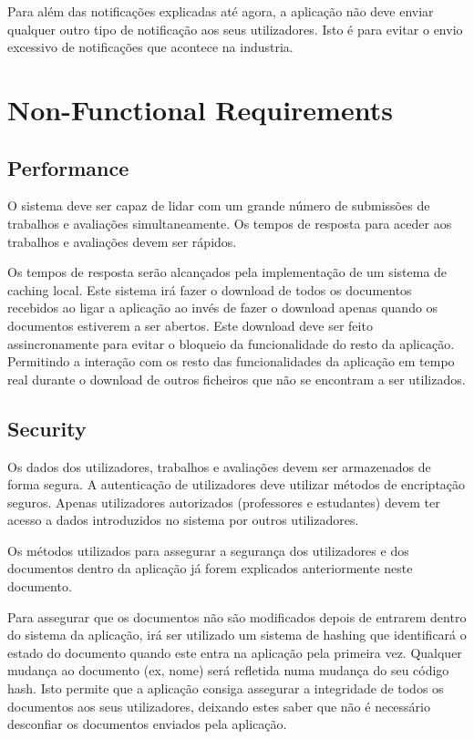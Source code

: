 \documentclass[10pt]{article}
\begin{document}
Para além das notificações explicadas até agora, a aplicação não deve enviar qualquer outro tipo de notificação
aos seus utilizadores. Isto é para evitar o envio excessivo de notificações que acontece na industria.

\newpage

\section{Non-Functional Requirements}

\subsection{Performance}
O sistema deve ser capaz de lidar com um grande número de submissões de trabalhos e avaliações simultaneamente. 
Os tempos de resposta para aceder aos trabalhos e avaliações devem ser rápidos.

Os tempos de resposta serão alcançados pela implementação de um sistema de caching local.
Este sistema irá fazer o download de todos os documentos recebidos ao ligar a aplicação ao invés
de fazer o download apenas quando os documentos estiverem a ser abertos. Este download deve ser
feito assincronamente para evitar o bloqueio da funcionalidade do resto da aplicação. Permitindo
a interação com os resto das funcionalidades da aplicação em tempo real durante o download de outros
ficheiros que não  se encontram a ser utilizados.

\subsection{Security}
Os dados dos utilizadores, trabalhos e avaliações devem ser armazenados de forma segura. 
A autenticação de utilizadores deve utilizar métodos de encriptação seguros. 
Apenas utilizadores autorizados (professores e estudantes) devem ter acesso a dados introduzidos no sistema por outros 
utilizadores.

Os métodos utilizados para assegurar a segurança dos utilizadores e dos documentos dentro da aplicação já forem explicados
anteriormente neste documento.

Para assegurar que os documentos não são modificados depois de entrarem dentro do sistema da aplicação, irá ser
utilizado um sistema de hashing que identificará o estado do documento quando este entra na aplicação pela primeira
vez. Qualquer mudança ao documento (ex, nome) será refletida numa mudança do seu código hash. Isto permite que a
aplicação consiga assegurar a integridade de todos os documentos aos seus utilizadores, deixando estes saber que
não é necessário desconfiar os documentos enviados pela aplicação.
\end{document}
